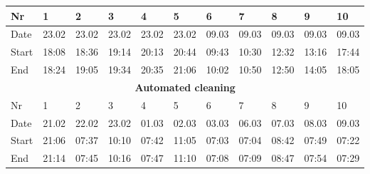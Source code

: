 \begin{table}[H]
\begin{tabular}{|lllllllllll|}
\multicolumn{1}{|l|}{Nr} & \multicolumn{1}{l|}{1}     & \multicolumn{1}{l|}{2}     & \multicolumn{1}{l|}{3}     & \multicolumn{1}{l|}{4}     & \multicolumn{1}{l|}{5}     & \multicolumn{1}{l|}{6}     & \multicolumn{1}{l|}{7}     & \multicolumn{1}{l|}{8}     & \multicolumn{1}{l|}{9}     & 10    \\ \hline
\multicolumn{1}{|l|}{Date}   & \multicolumn{1}{l|}{23.02} & \multicolumn{1}{l|}{23.02} & \multicolumn{1}{l|}{23.02} & \multicolumn{1}{l|}{23.02} & \multicolumn{1}{l|}{23.02} & \multicolumn{1}{l|}{09.03} & \multicolumn{1}{l|}{09.03} & \multicolumn{1}{l|}{09.03} & \multicolumn{1}{l|}{09.03} & 09.03 \\ \hline
\multicolumn{1}{|l|}{Start}  & \multicolumn{1}{l|}{18:08} & \multicolumn{1}{l|}{18:36} & \multicolumn{1}{l|}{19:14} & \multicolumn{1}{l|}{20:13} & \multicolumn{1}{l|}{20:44} & \multicolumn{1}{l|}{09:43} & \multicolumn{1}{l|}{10:30} & \multicolumn{1}{l|}{12:32} & \multicolumn{1}{l|}{13:16} & 17:44 \\ \hline
\multicolumn{1}{|l|}{End}    & \multicolumn{1}{l|}{18:24} & \multicolumn{1}{l|}{19:05} & \multicolumn{1}{l|}{19:34} & \multicolumn{1}{l|}{20:35} & \multicolumn{1}{l|}{21:06} & \multicolumn{1}{l|}{10:02} & \multicolumn{1}{l|}{10:50} & \multicolumn{1}{l|}{12:50} & \multicolumn{1}{l|}{14:05} & 18:05 \\ \hline
\multicolumn{11}{|c|}{\textbf{Automated cleaning}}                                                                                                                                                                                                                                                        \\ \hline
\multicolumn{1}{|l|}{Nr} & \multicolumn{1}{l|}{1}     & \multicolumn{1}{l|}{2}     & \multicolumn{1}{l|}{3}     & \multicolumn{1}{l|}{4}     & \multicolumn{1}{l|}{5}     & \multicolumn{1}{l|}{6}     & \multicolumn{1}{l|}{7}     & \multicolumn{1}{l|}{8}     & \multicolumn{1}{l|}{9}     & 10    \\ \hline
\multicolumn{1}{|l|}{Date}   & \multicolumn{1}{l|}{21.02} & \multicolumn{1}{l|}{22.02} & \multicolumn{1}{l|}{23.02} & \multicolumn{1}{l|}{01.03} & \multicolumn{1}{l|}{02.03} & \multicolumn{1}{l|}{03.03} & \multicolumn{1}{l|}{06.03} & \multicolumn{1}{l|}{07.03} & \multicolumn{1}{l|}{08.03} & 09.03 \\ \hline
\multicolumn{1}{|l|}{Start}  & \multicolumn{1}{l|}{21:06} & \multicolumn{1}{l|}{07:37} & \multicolumn{1}{l|}{10:10} & \multicolumn{1}{l|}{07:42} & \multicolumn{1}{l|}{11:05} & \multicolumn{1}{l|}{07:03} & \multicolumn{1}{l|}{07:04} & \multicolumn{1}{l|}{08:42} & \multicolumn{1}{l|}{07:49} & 07:22 \\ \hline
\multicolumn{1}{|l|}{End}    & \multicolumn{1}{l|}{21:14} & \multicolumn{1}{l|}{07:45} & \multicolumn{1}{l|}{10:16} & \multicolumn{1}{l|}{07:47} & \multicolumn{1}{l|}{11:10} & \multicolumn{1}{l|}{07:08} & \multicolumn{1}{l|}{07:09} & \multicolumn{1}{l|}{08:47} & \multicolumn{1}{l|}{07:54} & 07:29 \\ \hline
\end{tabular}
\end{table}


